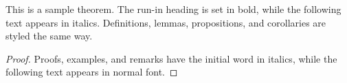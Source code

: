 \documentclass[runningheads]{llncs}
\begin{document}
\begin{theorem}
This is a sample theorem. The run-in heading is set in bold, while
the following text appears in italics. Definitions, lemmas,
propositions, and corollaries are styled the same way.
\end{theorem}
%
%
\begin{proof}
Proofs, examples, and remarks have the initial word in italics,
while the following text appears in normal font.
\end{proof}
%
%
%


%







\end{document}
